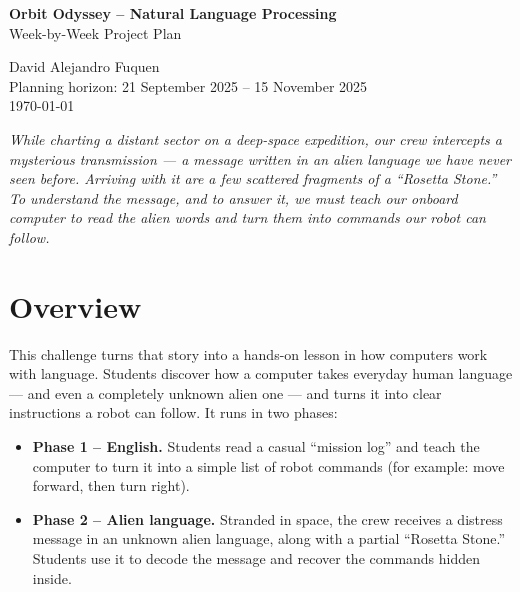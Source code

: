 \documentclass[a4]{article}
\begin{document}
\thispagestyle{fancy}

\begin{center}
    \textbf{\large Orbit Odyssey -- Natural Language Processing} \\
    {Week-by-Week Project Plan}

    \vspace{0.7em}

    David Alejandro Fuquen \\

    {\small Planning horizon: 21 September 2025 -- 15 November 2025} \\
    {\small \today}
\end{center}

\vspace{0.5em}

\begin{center}
\begin{minipage}{0.92\linewidth}
\itshape
While charting a distant sector on a deep-space expedition, our crew intercepts a
mysterious transmission --- a message written in an alien language we have never
seen before. Arriving with it are a few scattered fragments of a ``Rosetta Stone.''
To understand the message, and to answer it, we must teach our onboard computer to
read the alien words and turn them into commands our robot can follow.
\end{minipage}
\end{center}

\vspace{0.6em}

\section{Overview}

This challenge turns that story into a hands-on lesson in how computers work with
language. Students discover how a computer takes everyday human language --- and
even a completely unknown alien one --- and turns it into clear instructions a robot
can follow. It runs in two phases:

\begin{itemize}[leftmargin=*]
    \item \textbf{Phase 1 -- English.} Students read a casual ``mission log''
    and teach the computer to turn it into a simple list of robot commands
    (for example: move forward, then turn right).
    \item \textbf{Phase 2 -- Alien language.} Stranded in space, the crew receives
    a distress message in an unknown alien language, along with a partial
    ``Rosetta Stone.'' Students use it to decode the message and recover the
    commands hidden inside.
\end{itemize}
\end{document}

